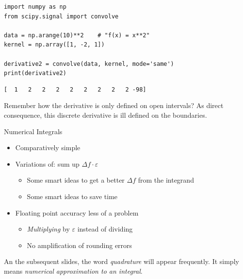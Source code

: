
\begin{frame}[fragile]
%
\begin{codebox}
\begin{verbatim}
import numpy as np
from scipy.signal import convolve

data = np.arange(10)**2    # "f(x) = x**2"
kernel = np.array([1, -2, 1])

derivative2 = convolve(data, kernel, mode='same')
print(derivative2)
\end{verbatim}
\end{codebox}
%
\begin{cmdbox}
\begin{verbatim}
[  1   2   2   2   2   2   2   2   2 -98]
\end{verbatim}
\end{cmdbox}
%
\begin{hintbox}
\small
Remember how the derivative is only defined on open intervals? As direct consequence, this discrete derivative is ill defined on the boundaries.
\end{hintbox}
%
\end{frame}


\begin{frame}[fragile]{Numerical Integrals}
%
\begin{itemize}
\item Comparatively simple
\item Variations of: sum up $\Delta f \cdot \varepsilon$
	\begin{itemize}
	\item Some smart ideas to get a better $\Delta{f}$ from the integrand
	\item Some smart ideas to save time
	\end{itemize}
\item Floating point accuracy less of a problem
	\begin{itemize}
	\item \emph{Multiplying} by $\varepsilon$ instead of dividing
	\item No amplification of rounding errors
	\end{itemize}
\end{itemize}
%
\begin{hintbox}[Quadrature]
An the subsequent slides, the word \emph{quadrature} will appear frequently. It simply means \emph{numerical approximation to an integral}.
\end{hintbox}
%
\end{frame}

